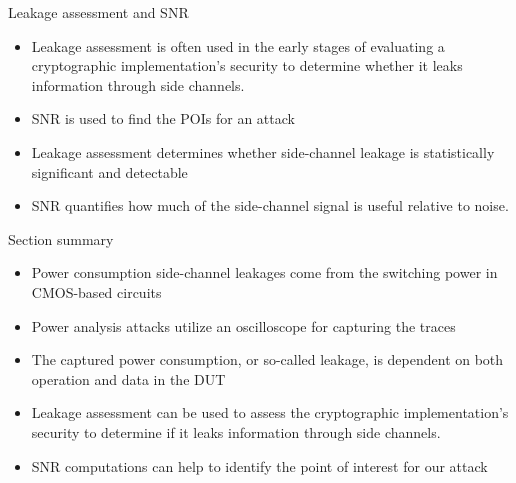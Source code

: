 \begin{frame}{Leakage assessment and SNR}
    \begin{itemize}
        \item Leakage assessment is often used in the early stages of evaluating a cryptographic implementation’s security to determine whether it leaks information through side channels.
        \item SNR is used to find the POIs for an attack
    \end{itemize}

    \begin{itemize}
        \item Leakage assessment determines whether side-channel leakage is statistically significant and detectable
        \item SNR quantifies how much of the side-channel signal is useful relative to noise.
    \end{itemize}
\end{frame}

\begin{frame}{Section summary}
    \begin{itemize}
        \item Power consumption side-channel leakages come from the switching power in CMOS-based circuits
        \item Power analysis attacks utilize an oscilloscope for capturing the traces
        \item The captured power consumption, or so-called leakage, is dependent on both operation and data in the DUT
        \item Leakage assessment can be used to assess the cryptographic implementation’s security to determine if it leaks information through side channels.
        \item SNR computations can help to identify the point of interest for our attack
    \end{itemize}
\end{frame}